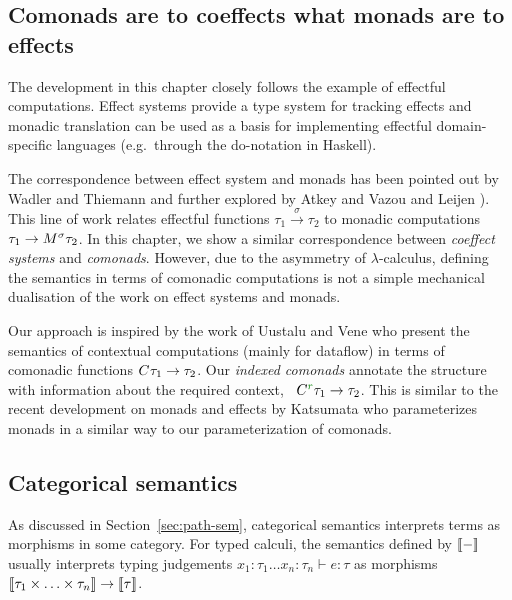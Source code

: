 
\subsection{Comonads are to coeffects what monads are to effects}

The development in this chapter closely follows the example of effectful computations. 
Effect systems provide a type system for tracking effects and monadic translation can be used as 
a basis for implementing effectful domain-specific languages (e.g.~through the do-notation in 
Haskell). 

The correspondence between effect system and monads has been pointed out by Wadler and Thiemann 
\cite{monads-effects-marriage} and further explored by Atkey \cite{monads-parameterised-notions}
and Vazou and Leijen \cite{monads-effects-remarriage}). This line of work relates effectful 
functions $\tau_1 \xrightarrow{\sigma} \tau_2$ to monadic computations 
$\tau_1 \rightarrow M^{\sigma}\tau_2$. In this chapter, we show a similar correspondence between 
\emph{coeffect systems} and \emph{comonads}. However, due to the asymmetry of $\lambda$-calculus, 
defining the semantics in terms of comonadic computations is not a simple mechanical dualisation
of the work on effect systems and monads.

Our approach is inspired by the work of Uustalu and Vene \cite{comonads-notions} who present the 
semantics of contextual computations (mainly for dataflow) in terms of comonadic functions 
$C^{}\tau_1 \rightarrow \tau_2$. Our \emph{indexed comonads} annotate the structure with 
information about the required context, \ie~$\ctyp{\cclrd{r}} \tau_1 \rightarrow \tau_2$.
This is similar to the recent development on monads and effects by Katsumata \cite{monads-parametric}
who parameterizes monads in a similar way to our parameterization of comonads.


\subsection{Categorical semantics}

As discussed in Section~\ref{sec:path-sem}, categorical semantics interprets terms as morphisms
in some category. For typed calculi, the semantics defined by $\llbracket - \rrbracket$ usually interprets typing 
judgements $x_1 \!:\! \tau_1 \ldots x_n \!:\! \tau_n \vdash e: \tau$ as morphisms 
$\llbracket \tau_1 \times \ldots \times \tau_n \rrbracket \rightarrow \llbracket \tau \rrbracket$.

